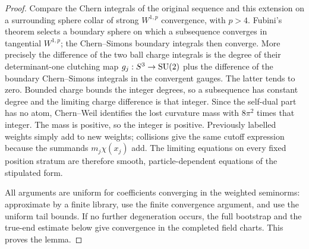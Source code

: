 \begin{proof}
Compare the Chern integrals of the original sequence and this extension
on a surrounding sphere collar of strong $W^{1,p}$ convergence, with
$p>4$.  Fubini's theorem selects a boundary sphere on which a subsequence
converges in tangential $W^{1,p}$; the Chern--Simons boundary integrals
then converge.  More precisely the difference of the two ball charge
integrals is the degree of their determinant-one clutching map
$g_j:S^3\to\operatorname{SU}(2)$ plus the difference of the boundary
Chern--Simons integrals in the convergent gauges.  The latter tends
to zero.  Bounded charge bounds the integer degrees, so a subsequence
has constant degree and the limiting charge difference is that integer.
Since the self-dual part has no
atom, Chern--Weil identifies the lost curvature mass with $8\pi^2$
times that integer.  The mass is positive, so the integer is positive.
Previously labelled weights simply add to new weights; collisions give
the same cutoff expression because the summands $m_j\chi(x_j)$ add.
The limiting equations on every fixed position stratum are therefore
smooth, particle-dependent equations of the stipulated form.

All arguments are uniform for coefficients converging in the weighted
seminorms: approximate by a finite library, use the finite convergence
argument, and use the uniform tail bounds.  If no further degeneration
occurs, the full bootstrap and the true-end estimate below give
convergence in the completed field charts.  This proves the lemma.
\end{proof}

